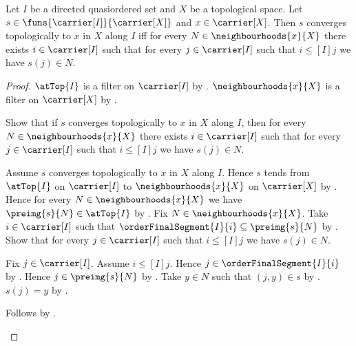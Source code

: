 \begin{theorem}\label{topological_net_converges_iff_eventually_in_neighbourhoods}
    Let $I$ be a directed quasiordered set and $X$ be a topological space.
    Let $s\in\funs{\carrier[I]}{\carrier[X]}$ and
        $x\in\carrier[X]$.
    Then $s$ converges topologically to $x$ in $X$ along $I$ iff
        for every $N\in\neighbourhoods{x}{X}$ there exists
        $i\in\carrier[I]$ such that for every $j\in\carrier[I]$
        such that $i\mathrel{\leq[I]}j$ we have $s(j)\in N$.
\end{theorem}
\begin{proof}
    $\atTop{I}$ is a filter on $\carrier[I]$ by
        .
    $\neighbourhoods{x}{X}$ is a filter on $\carrier[X]$ by
        .

    Show that if $s$ converges topologically to $x$ in $X$ along $I$, then
        for every $N\in\neighbourhoods{x}{X}$ there exists
        $i\in\carrier[I]$ such that for every $j\in\carrier[I]$
        such that $i\mathrel{\leq[I]}j$ we have $s(j)\in N$.
    \begin{subproof}
        Assume $s$ converges topologically to $x$ in $X$ along $I$.
        Hence $s$ tends from $\atTop{I}$ on $\carrier[I]$ to
            $\neighbourhoods{x}{X}$ on $\carrier[X]$ by
            .
        Hence for every $N\in\neighbourhoods{x}{X}$ we have
            $\preimg{s}{N}\in\atTop{I}$ by
            .
        Fix $N\in\neighbourhoods{x}{X}$.
        Take $i\in\carrier[I]$ such that
            $\orderFinalSegment{I}{i}\subseteq\preimg{s}{N}$ by
            .
        Show that for every $j\in\carrier[I]$ such that
            $i\mathrel{\leq[I]}j$ we have $s(j)\in N$.
        \begin{subproof}
            Fix $j\in\carrier[I]$.
            Assume $i\mathrel{\leq[I]}j$.
            Hence $j\in\orderFinalSegment{I}{i}$ by
                .
            Hence $j\in\preimg{s}{N}$ by .
            Take $y\in N$ such that $(j,y)\in s$ by .
            $s(j)=y$ by .
        \end{subproof}
        Follows by \auto.
    \end{subproof}


\end{proof}
